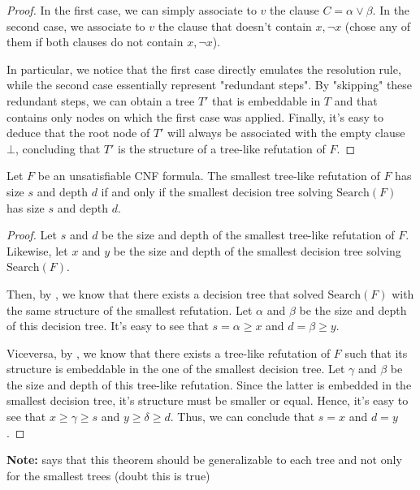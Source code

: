 \begin{proof}
    In the first case, we can simply associate to $v$ the clause $C = \alpha \lor \beta$.  In the second case, we associate to $v$ the clause that doesn't contain $x, \lnot{x}$ (chose any of them if both clauses do not contain $x, \lnot{x}$).

    In particular, we notice that the first case directly emulates the resolution rule, while the second case essentially represent "redundant steps". By "skipping" these redundant steps, we can obtain a tree $T'$ that is embeddable in $T$ and that contains only nodes on which the first case was applied. Finally, it's easy to deduce that the root node of $T'$ will always be associated with the empty clause $\bot$, concluding that $T'$ is the structure of a tree-like refutation of $F$.

\end{proof}

\begin{theorem}
Let $F$ be an unsatisfiable CNF formula. The smallest tree-like refutation of $F$ has size $s$ and depth $d$ if and only if the smallest decision tree solving $\mathrm{Search}(F)$ has size $s$ and depth $d$.
\end{theorem}

\begin{proof}
    Let $s$ and $d$ be the size and depth of the smallest tree-like refutation of $F$. Likewise, let $x$ and $y$ be the size and depth of the smallest decision tree solving $\mathrm{Search}(F)$.

    Then, by , we know that there exists a decision tree that solved $\mathrm{Search}(F)$ with the same structure of the smallest refutation. Let $\alpha$ and $\beta$ be the size and depth of this decision tree. It's easy to see that $s = \alpha \geq x$ and $d = \beta \geq y$.

    Viceversa, by , we know that there exists a tree-like refutation of $F$ such that its structure is embeddable in the one of the smallest decision tree. Let $\gamma$ and $\beta$ be the size and depth of this tree-like refutation. Since the latter is embedded in the smallest decision tree, it's structure must be smaller or equal. Hence, it's easy to see that $x \geq \gamma \geq s$ and $y \geq \delta \geq d$. Thus, we can conclude that $s = x$ and $d = y$.

\end{proof}

\textbf{Note:} \cite{proofs_circuits_communication} says that this theorem should be generalizable to each tree and not only for the smallest trees (doubt this is true)

